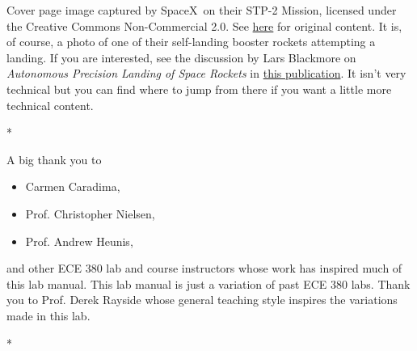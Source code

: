 \documentclass[letterpaper, 12pt, oneside]{memoir}
\begin{document}
\noindent
Cover page image captured by SpaceX\textregistered~on their
STP-2 Mission, licensed under the Creative Commons Non-Commercial 2.0. See
\href{https://www.flickr.com/photos/spacex/48129269942/}{here}
for original content. It is, of course, a photo of one of their self-landing
booster rockets attempting a landing. If you are interested, see the discussion
by Lars Blackmore on \emph{Autonomous Precision Landing of Space Rockets}
in
\href{http://www.larsblackmore.com/nae_bridge_2016.pdf}{this publication}. It
isn't very technical but you can find where to jump from there if you want a
little more technical content.
\begin{center}
  * \qquad * \qquad *
\end{center}
\noindent
A big thank you to
\begin{itemize}[label={}]
  \item{Carmen Caradima,}
  \item{Prof. Christopher Nielsen,}
  \item{Prof. Andrew Heunis,}
\end{itemize}
and other ECE 380 lab and course instructors whose work has inspired much
of this lab manual. This lab manual is just a variation of past
ECE 380 labs. Thank you to Prof. Derek Rayside whose general teaching
style inspires the variations made in this lab.
\begin{center}
  * \qquad * \qquad *
\end{center}

\pagebreak

\frontmatter

\tableofcontents*
\thispagestyle{empty}

\clearpage
\listoffigures*

\clearpage
\listoftables*

%


\mainmatter



% 


\appendix



\backmatter
\end{document}
